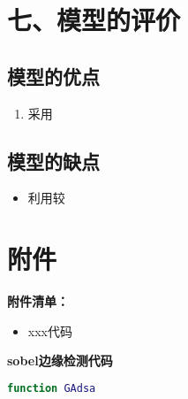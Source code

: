 \documentclass{my_paper}
\begin{document}
\section{七、模型的评价}

\subsection{模型的优点}
\begin{enumerate}
    \item 采用

\end{enumerate}

\subsection{模型的缺点}
\begin{itemize}
    \item 利用较

\end{itemize}

\newpage
\begin{center}
\end{center}

\newpage
\section{附件}
\textbf{附件清单：}
\begin{itemize}
    \item xxx代码
\end{itemize}

\textbf{sobel边缘检测代码}

\begin{lstlisting}[language=matlab]
    function GAdsa 
\end{lstlisting}
\end{document}
